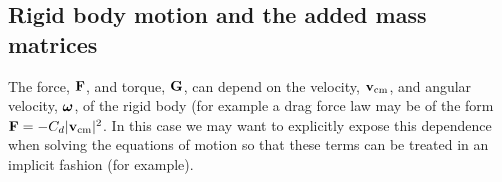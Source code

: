
\subsection{Rigid body motion and the added mass matrices} \label{sec:rigidBodyAddedMass}


The force, $\mathbf{ F}$, and torque, $\mathbf{ G}$, can depend on the velocity, $\mathbf{ v}_{\rm cm}$, and angular velocity, $\boldsymbol{\omega}$, of the
rigid body (for example a drag force law may be of the form $\mathbf{ F} = - C_d |\mathbf{ v}_{\rm cm}|^2$. In this case we may want to
explicitly expose this dependence when solving the equations of motion so that these terms can
be treated in an implicit fashion (for example). 

